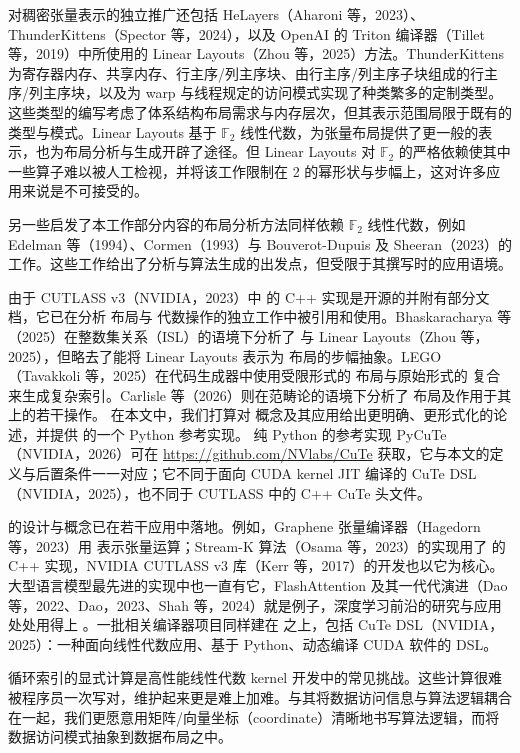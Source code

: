 对稠密张量表示的独立推广还包括 HeLayers（Aharoni 等，2023）、ThunderKittens（Spector 等，2024），以及 OpenAI 的 Triton 编译器（Tillet 等，2019）中所使用的 Linear Layouts（Zhou 等，2025）方法。ThunderKittens 为寄存器内存、共享内存、行主序/列主序块、由行主序/列主序子块组成的行主序/列主序块，以及为 warp 与线程规定的访问模式实现了种类繁多的定制类型。这些类型的编写考虑了体系结构布局需求与内存层次，但其表示范围局限于既有的类型与模式。Linear Layouts 基于 $\mathbb{F}_2$ 线性代数，为张量布局提供了更一般的表示，也为布局分析与生成开辟了途径。但 Linear Layouts 对 $\mathbb{F}_2$ 的严格依赖使其中一些算子难以被人工检视，并将该工作限制在 2 的幂形状与步幅上，这对许多应用来说是不可接受的。

另一些启发了本工作部分内容的布局分析方法同样依赖 $\mathbb{F}_2$ 线性代数，例如 Edelman 等（1994）、Cormen（1993）与 Bouverot-Dupuis 及 Sheeran（2023）的工作。这些工作给出了分析与算法生成的出发点，但受限于其撰写时的应用语境。

由于 CUTLASS v3（NVIDIA，2023）中 \CuTe 的 C++ 实现是开源的并附有部分文档，它已在分析 \CuTe 布局与 \CuTe 代数操作的独立工作中被引用和使用。Bhaskaracharya 等（2025）在整数集关系（ISL）的语境下分析了 \CuTe 与 Linear Layouts（Zhou 等，2025），但略去了能将 Linear Layouts 表示为 \CuTe 布局的步幅抽象。LEGO（Tavakkoli 等，2025）在代码生成器中使用受限形式的 \CuTe 布局与原始形式的 \CuTe 复合来生成复杂索引。Carlisle 等（2026）则在范畴论的语境下分析了 \CuTe 布局及作用于其上的若干操作。
在本文中，我们打算对 \CuTe 概念及其应用给出更明确、更形式化的论述，并提供 \CuTe 的一个 Python 参考实现。
纯 Python 的参考实现 PyCuTe（NVIDIA，2026）可在 \url{https://github.com/NVlabs/CuTe} 获取，它与本文的定义与后置条件一一对应；它不同于面向 CUDA kernel JIT 编译的 CuTe DSL（NVIDIA，2025），也不同于 CUTLASS 中的 C++ CuTe 头文件。

\CuTe 的设计与概念已在若干应用中落地。例如，Graphene 张量编译器（Hagedorn 等，2023）用 \CuTe 表示张量运算；Stream-K 算法（Osama 等，2023）的实现用了 \CuTe 的 C++ 实现，NVIDIA CUTLASS v3 库（Kerr 等，2017）的开发也以它为核心。大型语言模型最先进的实现中也一直有它，FlashAttention 及其一代代演进（Dao 等，2022、Dao，2023、Shah 等，2024）就是例子，深度学习前沿的研究与应用处处用得上 \CuTe。一批相关编译器项目同样建在 \CuTe 之上，包括 CuTe DSL（NVIDIA，2025）：一种面向线性代数应用、基于 Python、动态编译 CUDA 软件的 DSL。

\label{sec:loops}

循环索引的显式计算是高性能线性代数 kernel 开发中的常见挑战。这些计算很难被程序员一次写对，维护起来更是难上加难。与其将数据访问信息与算法逻辑耦合在一起，我们更愿意用矩阵/向量坐标（coordinate）清晰地书写算法逻辑，而将数据访问模式抽象到数据布局之中。

